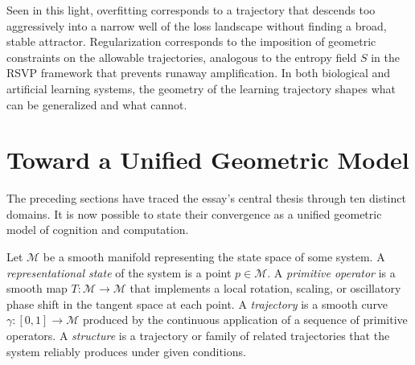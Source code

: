 \documentclass[11pt, a4paper]{article}
\theoremstyle{plain}
\theoremstyle{definition}
\theoremstyle{remark}
\begin{document}
Seen in this light, overfitting corresponds to a trajectory that descends too aggressively
into a narrow well of the loss landscape without finding a broad, stable attractor.
Regularization corresponds to the imposition of geometric constraints on the allowable
trajectories, analogous to the entropy field $S$ in the RSVP framework that prevents
runaway amplification. In both biological and artificial learning systems, the geometry
of the learning trajectory shapes what can be generalized and what cannot.


\section{Toward a Unified Geometric Model}

The preceding sections have traced the essay's central thesis through ten distinct
domains. It is now possible to state their convergence as a unified geometric model
of cognition and computation.

Let $\mathcal{M}$ be a smooth manifold representing the state space of some system.
A \emph{representational state} of the system is a point $p \in \mathcal{M}$.
A \emph{primitive operator} is a smooth map $T : \mathcal{M} \to \mathcal{M}$ that
implements a local rotation, scaling, or oscillatory phase shift in the tangent space
at each point. A \emph{trajectory} is a smooth curve $\gamma : [0,1] \to \mathcal{M}$
produced by the continuous application of a sequence of primitive operators.
A \emph{structure} is a trajectory or family of related trajectories that the system
reliably produces under given conditions.
\end{document}
